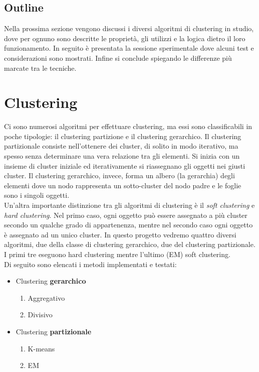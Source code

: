 \documentclass{llncs}
\newcommand{\acapo}{\vspace{0.5\baselineskip}\\}
\begin{document}
	\subsection{Outline}
	Nella prossima sezione vengono discussi i diversi algoritmi di clustering in studio, dove per ognuno sono descritte le proprietà, gli utilizzi e la logica dietro il loro funzionamento.
	In seguito è presentata la sessione sperimentale dove alcuni test e considerazioni sono mostrati. Infine si conclude spiegando le differenze più marcate tra le tecniche.
	\section{Clustering}
	Ci sono numerosi algoritmi per effettuare clustering, ma essi sono classificabili in poche tipologie: il clustering partizione e il clustering gerarchico.
	Il clustering partizionale consiste nell'ottenere dei cluster, di solito in modo iterativo, ma spesso senza determinare una vera relazione tra gli elementi. Si inizia con un insieme di cluster iniziale ed iterativamente
	si riassegnano gli oggetti nei giusti cluster. Il clustering gerarchico, invece, forma un albero (la gerarchia) degli elementi dove un nodo rappresenta un sotto-cluster del nodo padre e le foglie sono i singoli
	oggetti.
	\acapo
	Un'altra importante distinzione tra gli algoritmi di clustering è il \textit{soft clustering} e \textit{hard clustering}. Nel primo caso, ogni oggetto può essere assegnato a più cluster secondo un qualche
	grado di appartenenza, mentre nel secondo caso ogni oggetto è assegnato ad un unico cluster. In questo progetto vedremo quattro diversi algoritmi, due della classe di clustering gerarchico, due del clustering partizionale.
	I primi tre eseguono hard clustering mentre l'ultimo (EM) soft clustering.
	\acapo
	Di seguito sono elencati i metodi implementati e testati:
	\begin{itemize}
		\item Clustering \textbf{gerarchico}
		\begin{enumerate}
			\item Aggregativo
			\item Divisivo
		\end{enumerate}

		\item Clustering \textbf{partizionale}
		\begin{enumerate}
			\item K-means
			\item EM
		\end{enumerate}
	\end{itemize}
	
\end{document}
